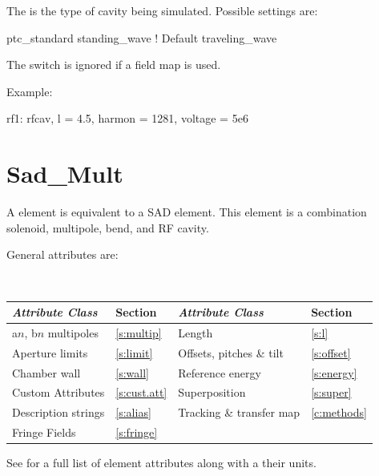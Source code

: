 {The  is the type of cavity being simulated. Possible
settings are:
\begin{example}
  ptc_standard
  standing_wave    ! Default
  traveling_wave
\end{example}
The  switch is ignored if a field map is used.

Example:
\begin{example}
  rf1: rfcav, l = 4.5, harmon = 1281, voltage = 5e6
\end{example}

\section{Sad_Mult}
\label{s:sad.mult}

A  element is equivalent to a SAD\cite{b:sad} 
element. This element is a combination solenoid, multipole, bend, and
RF cavity.

General  attributes are:
\begin{center}
\tt
\begin{tabular}{llll} \toprule
  {\sl Attribute Class}      & Section           & {\sl Attribute Class}      & Section         \\ \midrule
  a$n$, b$n$ multipoles      & \ref{s:multip}    & Length                     & \ref{s:l}       \\
  Aperture limits            & \ref{s:limit}     & Offsets, pitches \& tilt   & \ref{s:offset}  \\
  Chamber wall               & \ref{s:wall}      & Reference energy           & \ref{s:energy}  \\ 
  Custom Attributes          & \ref{s:cust.att}  & Superposition              & \ref{s:super}   \\
  Description strings        & \ref{s:alias}     & Tracking \& transfer map   & \ref{c:methods} \\ 
  Fringe Fields              & \ref{s:fringe}    &                            &                 \\
  \bottomrule
\end{tabular}
\end{center}
\toffset
See  for a full list of element attributes along with a their units.

}
